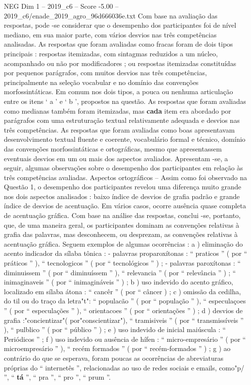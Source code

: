 \begin{textsample}{NEG Dim 1 – 2019\_c6 – Score -5.00 – 2019\_c6/enade\_2019\_agro\_96d666036e.txt}
Com base na avaliação das respostas, pode -se considerar que o desempenho dos participantes foi de nível mediano, em sua maior parte, com vários desvios nas três competências analisadas.
As respostas que foram avaliadas como fracas foram de dois tipos principais : respostas itemizadas, com sintagmas reduzidos a um núcleo, acompanhado ou não por modificadores ; ou respostas itemizadas constituídas por pequenos parágrafos, com muitos desvios nas três competências, principalmente na seleção vocabular e no domínio das convenções morfossintáticas.
Em comum nos dois tipos, a pouca ou nenhuma articulação entre os itens ‘ a ’ e ‘ b ’, propostos na questão.
As respostas que foram avaliadas como medianas também foram itemizadas, mas \textbf{cada} item era abordado por parágrafos com uma estruturação textual relativamente adequada e desvios nas três competências.
As respostas que foram avaliadas como boas apresentavam desenvolvimento textual fluente e coerente, vocabulário formal e técnico, domínio das convenções morfossintáticas e ortográficas, mesmo que apresentassem eventuais desvios em um ou mais dos aspectos avaliados.
Apresentam -se, a seguir, algumas observações sobre o desempenho dos participantes em relação às três competências avaliadas.
Aspectos ortográficos – Assim como foi observado na Questão 1, o desempenho dos participantes revelou uma diferença muito grande nos dois aspectos analisados : baixo índice de desvios de grafia padrão e grande índice de desvios de acentuação.
Em vários casos, ocorre ausência quase completa de acentuação gráfica.
Com base na análise das respostas, conclui -se, portanto, que, de uma maneira geral, os participantes dominam as convenções relativas à grafia das palavras, mas desconhecem, ou desprezam, as convenções relativas à acentuação gráfica.
Seguem exemplos de algumas ocorrências : a ) eliminação do acento indicador da sílaba tônica : - palavras proparoxítonas : “ praticos ” ( por “ práticos ” ), “ tecnologicos ” ( por “ tecnológicos ” ) ; - palavras paroxítonas : “ diminuissem ” ( por “ diminuíssem ” ), “ relevancia ” ( por “ relevância ” ) ; “ inimaginaveis ” ( por “ inimagináveis ” ) ; b ) uso indevido do acento gráfico, localizado em sílaba átona : “ cancêr ” ( por “ câncer ) ; c ) omissão da cedilha, do til ou do traço da letra"t": “ populacão ” ( por “ população ” ), “ especulaçoes ” ( por “ especulações ” ), “ orientacoes ” ( por “ orientações ” ) ; d ) desvios de grafia :"concientizar"( por"conscientizar"), “ tramisiveis ” ( por “ transmissíveis ” ), “ pulblico ” ( por “ público ” ) ; e ) uso indevido de inicial maiúscula : “ Periódicos ” ; f ) uso indevido ou ausência de hífen : “ micro-empresário ” ( por “ microempresário ” ), “ recém formados ” ( por “ recém-formados ” ) ; g ) ao contrário do que se esperava, foram poucas as ocorrências de abreviaturas próprias do “ internetês ”, relacionadas ao uso de redes sociais e emails, como"p/ ”, “ \textbf{tá} ”, “ pra ”, “ pro ”, “ prum ”.

\end{textsample}
